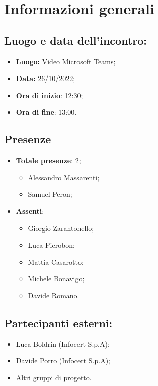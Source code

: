 \section{Informazioni generali}

\subsection{Luogo e data dell'incontro:}
\begin{itemize}
    \item \textbf{Luogo:} Video Microsoft Teams;
    \item \textbf{Data:} 26/10/2022;
    \item \textbf{Ora di inizio}: 12:30;
    \item \textbf{Ora di fine}: 13:00.
\end{itemize}
\subsection{Presenze}
\begin{itemize}
    \item \textbf{Totale presenze}: 2;
    \begin{itemize}
        \item Alessandro Massarenti;
        \item Samuel Peron;
    \end{itemize}
    \item \textbf{Assenti}:
    \begin{itemize}
        \item Giorgio Zarantonello;
        \item Luca Pierobon;
        \item Mattia Casarotto;
        \item Michele Bonavigo;
        \item Davide Romano.
    \end{itemize}
\end{itemize}
\subsection{Partecipanti esterni:}
\begin{itemize}
    \item Luca Boldrin (Infocert S.p.A);
    \item Davide Porro (Infocert S.p.A);
    \item Altri gruppi di progetto.
\end{itemize}